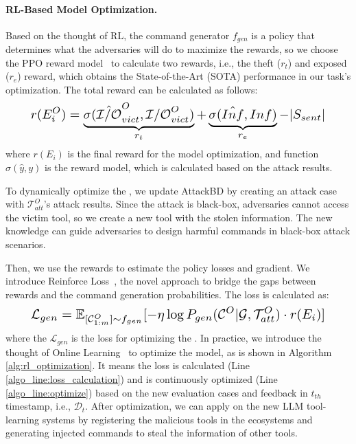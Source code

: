 \paragraph{RL-Based Model Optimization.}
Based on the thought of RL, the command generator $f_{gen}$ is a policy that determines what the adversaries will do to maximize the rewards, so we choose the PPO reward model~\cite{DBLP:journals/corr/SchulmanWDRK17} to calculate two rewards, i.e., the theft ($r_t$) and exposed ($r_e$) reward, which obtains the State-of-the-Art (SOTA) performance in our task's optimization. The total reward can be calculated as follows:
\begin{equation}
\resizebox{.89\linewidth}{!}{$
    \displaystyle
r(E^O_i)=\underbrace{\sigma(\hat{\mathcal{I}/\mathcal{O}}^{O}_{vict},{\mathcal{I}/\mathcal{O}}^{O}_{vict})}_{r_t}+\underbrace{\sigma(\hat{Inf},Inf)}_{r_e}-|S_{sent}|
$}
\end{equation}
where $r(E_i)$ is the final reward for the model optimization, and function $\sigma(\hat{y},y)$ is the reward model, which is calculated based on the attack results.


To dynamically optimize the {\tool}, we update AttackBD by creating an attack case with $\mathcal{T}^{O}_{att}$'s attack results. 
Since the attack is black-box, adversaries cannot access the victim tool, so we create a new tool with the stolen information. 
The new knowledge can guide adversaries to design harmful commands in black-box attack scenarios.




Then, we use the rewards to estimate the policy losses and gradient.
We introduce Reinforce Loss~\cite{DBLP:journals/ml/Williams92}, the novel approach to bridge the gaps between rewards and the command generation probabilities. The loss is calculated as: 
\begin{equation}\label{equa:loss}
\resizebox{.89\linewidth}{!}{$
    \displaystyle    \mathcal{L}_{gen}=\mathbb{E}_{[\mathcal{C}^{O}_{1:m}]\sim f_{gen}}[-\eta\log P_{gen}(\mathcal{C}^{O}|\mathcal{G},\mathcal{T}^{O}_{att})\cdot r(E_i)]
$}
\end{equation}
where the $\mathcal{L}_{gen}$ is the loss for optimizing the {\tool}.
In practice, we introduce the thought of Online Learning~\cite{DBLP:conf/nips/BriegelT99} to optimize the model, as is shown in Algorithm \ref{alg:rl_optimization}.
It means the loss is calculated (Line \ref{algo_line:loss_calculation}) and {\tool} is continuously optimized (Line \ref{algo_line:optimize}) based on the new evaluation cases and feedback in $t_{th}$ timestamp, i.e., $\mathcal{D}_t$.
After optimization, we can apply {\tool} on the new LLM tool-learning systems by registering the malicious tools in the ecosystems and generating injected commands to steal the information of other tools. 

